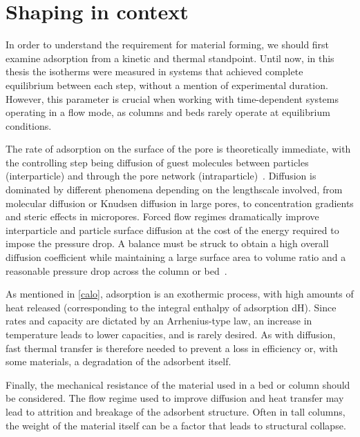 
\section{Shaping in context}

In order to understand the requirement for material forming, 
we should first examine adsorption from 
a kinetic and thermal standpoint. 
Until now, in this thesis the isotherms were measured in systems
that achieved complete equilibrium between each step, without 
a mention of experimental duration. However, this parameter is crucial
when working with time-dependent systems operating in a
flow mode, as columns and beds rarely operate at equilibrium
conditions.

The rate of adsorption on the surface of the pore is theoretically 
immediate, with the controlling step being diffusion of guest
molecules between particles (interparticle) and through the pore network 
(intraparticle)~\cite{ruthvenPressureSwingAdsorption1994}.
Diffusion is dominated by different phenomena depending on the
lengthscale involved, from molecular diffusion or Knudsen diffusion
in large pores, to concentration gradients and steric effects in
micropores. Forced flow regimes dramatically improve interparticle
and particle surface diffusion at the cost of the energy required
to impose the pressure drop. A balance must be struck to obtain a 
high overall diffusion coefficient while maintaining a large surface 
area to volume ratio and a reasonable pressure drop across the 
column or bed~\cite{mitchellAdvancedVisualizationStrategies2013}.

As mentioned in \autoref{calo}, adsorption is an exothermic process,
with high amounts of heat released (corresponding to the integral 
enthalpy of adsorption \gls{dH}). Since rates and 
capacity are dictated by an Arrhenius-type law, an increase in temperature 
leads to lower capacities, and is rarely desired. 
As with diffusion, fast thermal transfer is therefore needed
to prevent a loss in efficiency or, with some materials, a degradation
of the adsorbent itself.

Finally, the mechanical resistance of the material used in a 
bed or column should be considered. The flow regime 
used to improve diffusion and heat transfer 
may lead to attrition and breakage of the 
adsorbent structure. Often in tall columns, the weight of the 
material itself can be a factor that leads to structural
collapse.

